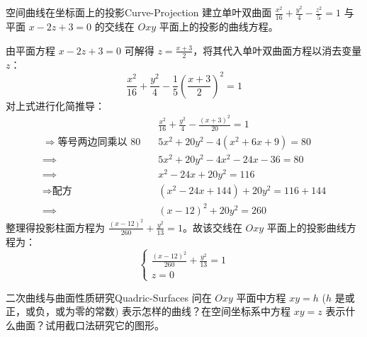 \begin{problem}{空间曲线在坐标面上的投影}{Curve-Projection}
    建立单叶双曲面 $\frac{x^2}{16} + \frac{y^2}{4} - \frac{z^2}{5} = 1$ 与平面 $x - 2z + 3 = 0$ 的交线在 $Oxy$ 平面上的投影的曲线方程。
\end{problem}

\begin{solution}
    由平面方程 $x - 2z + 3 = 0$ 可解得 $z = \frac{x+3}{2}$，将其代入单叶双曲面方程以消去变量 $z$：
    \begin{equation*}
        \frac{x^2}{16} + \frac{y^2}{4} - \frac{1}{5} \left( \frac{x+3}{2} \right)^2 = 1
    \end{equation*}
    对上式进行化简推导：
    \begin{equation*}
        \begin{aligned}
                                                      & \frac{x^2}{16} + \frac{y^2}{4} - \frac{(x+3)^2}{20} = 1 \\
            \Longrightarrow{\text{等号两边同乘以 } 80} \quad & 5x^2 + 20y^2 - 4(x^2 + 6x + 9) = 80                     \\
            \implies                                  & 5x^2 + 20y^2 - 4x^2 - 24x - 36 = 80                     \\
            \implies                                  & x^2 - 24x + 20y^2 = 116                                 \\
            \Longrightarrow{\text{配方}} \quad          & (x^2 - 24x + 144) + 20y^2 = 116 + 144                   \\
            \implies                                  & (x-12)^2 + 20y^2 = 260
        \end{aligned}
    \end{equation*}
    整理得投影柱面方程为 $\frac{(x-12)^2}{260} + \frac{y^2}{13} = 1$。故该交线在 $Oxy$ 平面上的投影曲线方程为：
    \begin{equation*}
        \boxed{\begin{cases} \frac{(x-12)^2}{260} + \frac{y^2}{13} = 1 \\ z = 0 \end{cases}}
    \end{equation*}
\end{solution}


\begin{problem}{二次曲线与曲面性质研究}{Quadric-Surfaces}
    问在 $Oxy$ 平面中方程 $xy = h$ ($h$ 是或正，或负，或为零的常数) 表示怎样的曲线？在空间坐标系中方程 $xy = z$ 表示什么曲面？试用截口法研究它的图形。
\end{problem}

